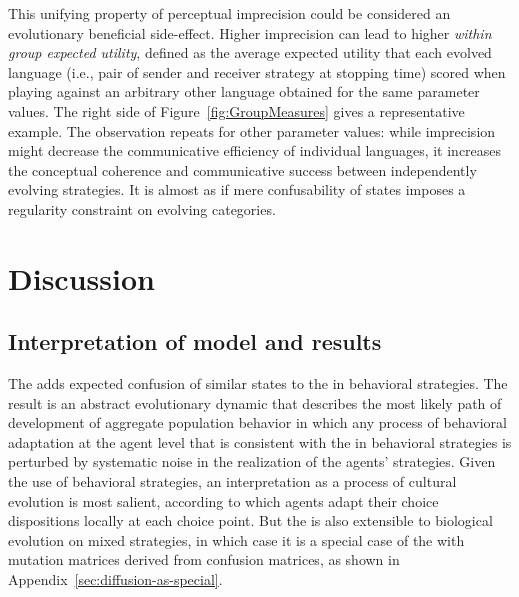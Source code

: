 \documentclass[fleqn,reqno,10pt]{article}
\newcommand{\rd}{\acro{rd}} %
\newcommand{\rmd}{\acro{rmd}} %
\newcommand{\rdd}{\acro{rdd}} %
\begin{document}
This unifying property of perceptual imprecision could be considered
an evolutionary beneficial side-effect. Higher imprecision can lead to
higher \emph{within group expected utility}, defined as the average
expected utility that each evolved language (i.e., pair of sender and
receiver strategy at stopping time) scored when playing against an
arbitrary other language obtained for the same parameter values. The
right side of Figure~\ref{fig:GroupMeasures} gives a representative
example. The observation repeats for other parameter values: while
imprecision might decrease the communicative efficiency of individual
languages, it increases the conceptual coherence and communicative
success between independently evolving strategies. It is almost as if
mere confusability of states imposes a regularity constraint on
evolving categories.


\section{Discussion}
\label{sec:discussion}

\subsection{Interpretation of model and results}
\label{sec:model-interpretation}

The \rdd adds expected confusion of similar states to the \rd in
behavioral strategies. The result is an abstract evolutionary dynamic
that describes the most likely path of development of aggregate
population behavior in which any process of behavioral adaptation at
the agent level that is consistent with the \rd in behavioral
strategies is perturbed by systematic noise in the realization of the
agents' strategies. Given the use of behavioral strategies, an
interpretation as a process of cultural evolution is most salient,
according to which agents adapt their choice dispositions locally at
each choice point. But the \rdd is also extensible to biological
evolution on mixed strategies, in which case it is a special case of
the \rmd with mutation matrices derived from confusion matrices, as
shown in Appendix~\ref{sec:diffusion-as-special}.
\end{document}
